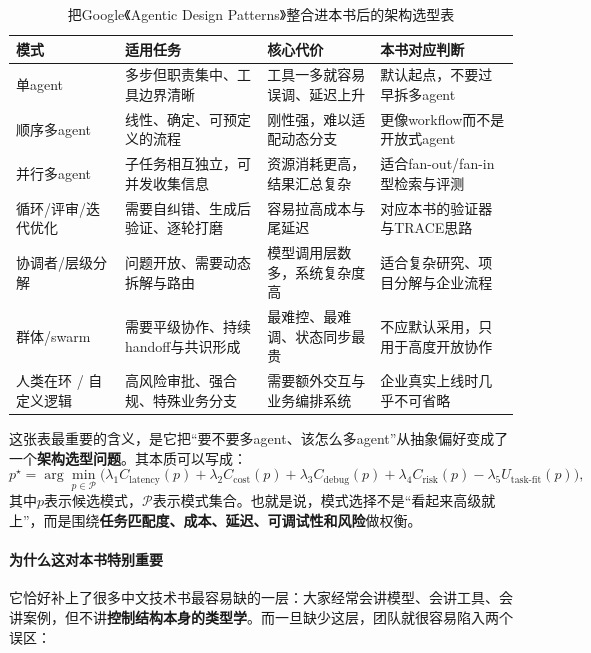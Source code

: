 \documentclass[12pt,a4paper]{article}
\begin{document}
\begin{table}[H]
\centering
\small
\caption{把Google《Agentic Design Patterns》整合进本书后的架构选型表}
\begin{tabular}{p{2.8cm}p{4.0cm}p{4.2cm}p{2.6cm}}
\toprule
\textbf{模式} & \textbf{适用任务} & \textbf{核心代价} & \textbf{本书对应判断} \\
\midrule
单agent & 多步但职责集中、工具边界清晰 & 工具一多就容易误调、延迟上升 & 默认起点，不要过早拆多agent \\
顺序多agent & 线性、确定、可预定义的流程 & 刚性强，难以适配动态分支 & 更像workflow而不是开放式agent \\
并行多agent & 子任务相互独立，可并发收集信息 & 资源消耗更高，结果汇总复杂 & 适合fan-out/fan-in型检索与评测 \\
循环/评审/迭代优化 & 需要自纠错、生成后验证、逐轮打磨 & 容易拉高成本与尾延迟 & 对应本书的验证器与TRACE思路 \\
协调者/层级分解 & 问题开放、需要动态拆解与路由 & 模型调用层数多，系统复杂度高 & 适合复杂研究、项目分解与企业流程 \\
群体/swarm & 需要平级协作、持续handoff与共识形成 & 最难控、最难调、状态同步最贵 & 不应默认采用，只用于高度开放协作 \\
人类在环 / 自定义逻辑 & 高风险审批、强合规、特殊业务分支 & 需要额外交互与业务编排系统 & 企业真实上线时几乎不可省略 \\
\bottomrule
\end{tabular}
\end{table}

这张表最重要的含义，是它把“要不要多agent、该怎么多agent”从抽象偏好变成了一个\textbf{架构选型问题}。其本质可以写成：
\begin{equation}
p^\star
=
\arg\min_{p \in \mathcal{P}}
\Big(
\lambda_1 C_{\text{latency}}(p)
+
\lambda_2 C_{\text{cost}}(p)
+
\lambda_3 C_{\text{debug}}(p)
+
\lambda_4 C_{\text{risk}}(p)
-
\lambda_5 U_{\text{task-fit}}(p)
\Big),
\end{equation}
其中$p$表示候选模式，$\mathcal{P}$表示模式集合。也就是说，模式选择不是“看起来高级就上”，而是围绕\textbf{任务匹配度、成本、延迟、可调试性和风险}做权衡。

\paragraph{为什么这对本书特别重要}

它恰好补上了很多中文技术书最容易缺的一层：大家经常会讲模型、会讲工具、会讲案例，但不讲\textbf{控制结构本身的类型学}。而一旦缺少这层，团队就很容易陷入两个误区：
\end{document}
